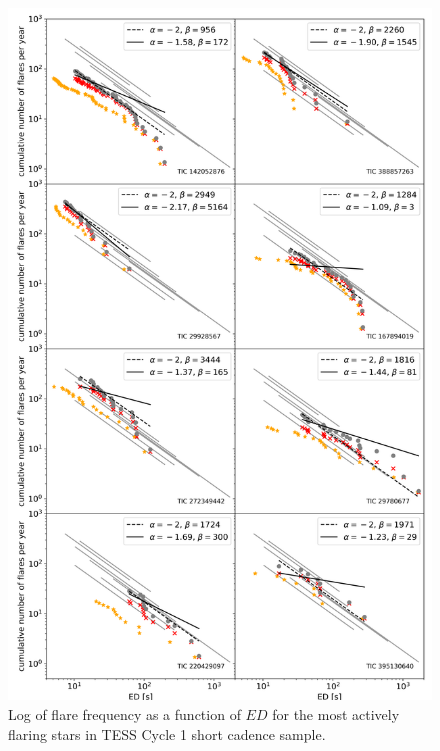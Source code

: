 \documentclass[twocolumn]{aastex62}
\begin{document}
\begin{figure}
\centering
	\includegraphics[width=1.5\columnwidth]{12_03_2020_14_10_individual_target_ffds.png}
    \caption{Log of flare frequency as a function of $ED$ for the most actively flaring stars in TESS Cycle 1 short cadence sample.}
    \label{fig:ffd_indiv_ed}
\end{figure}
\end{document}
